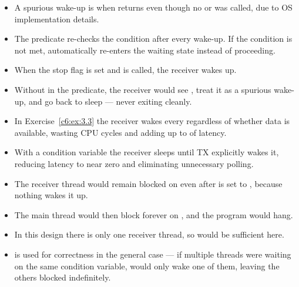 \begin{itemize}
  \item A spurious wake-up is when  returns even though no  or
     was called, due to OS implementation details.
  \item The predicate re-checks the condition after every wake-up. If the condition is not met,
     automatically re-enters the waiting state instead of proceeding.
\end{itemize}

\begin{itemize}
  \item When the stop flag is set and  is called, the receiver wakes up.
  \item Without  in the predicate, the receiver would see
    , treat it as a spurious wake-up, and go back to sleep --- never
    exiting cleanly.
\end{itemize}

\begin{itemize}
  \item In Exercise~\ref{c6:ex:3.3} the receiver wakes every  regardless of whether
    data is available, wasting CPU cycles and adding up to  of latency.
  \item With a condition variable the receiver sleeps until TX explicitly wakes it, reducing
    latency to near zero and eliminating unnecessary polling.
\end{itemize}

\begin{itemize}
  \item The receiver thread would remain blocked on  even after  is set
    to , because nothing wakes it up.
  \item The main thread would then block forever on , and the program would hang.
\end{itemize}

\begin{itemize}
  \item In this design there is only one receiver thread, so  would be
    sufficient here.
  \item {} is used for correctness in the general case --- if multiple threads were
    waiting on the same condition variable,  would only wake one of them,
    leaving the others blocked indefinitely.
\end{itemize}

